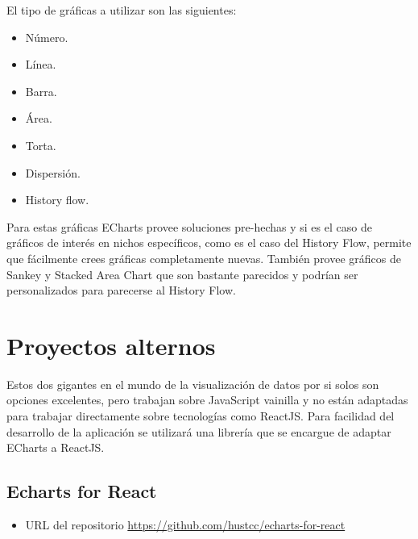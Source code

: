 El tipo de gráficas a utilizar son las siguientes:
\begin{itemize}    
    \item Número.
    \item Línea.
    \item Barra.
    \item Área.
    \item Torta.
    \item Dispersión.
    \item History flow.
\end{itemize}

Para estas gráficas ECharts provee soluciones pre-hechas y si es el caso de gráficos de interés en nichos específicos, como es el caso del History Flow, permite que fácilmente crees gráficas completamente nuevas.
También provee gráficos de Sankey y Stacked Area Chart que son bastante parecidos y podrían ser personalizados para parecerse al History Flow.

\section{ Proyectos alternos }
Estos dos gigantes en el mundo de la visualización de datos por si solos son opciones excelentes, pero trabajan sobre JavaScript vainilla y no están adaptadas para trabajar directamente sobre tecnologías como ReactJS. 
Para facilidad del desarrollo de la aplicación se utilizará una librería que se encargue de adaptar ECharts a ReactJS.

\subsection{ Echarts for React }
\begin{itemize}
    \item URL del repositorio \href{https://github.com/hustcc/echarts-for-react}{https://github.com/hustcc/echarts-for-react}
\end{itemize}